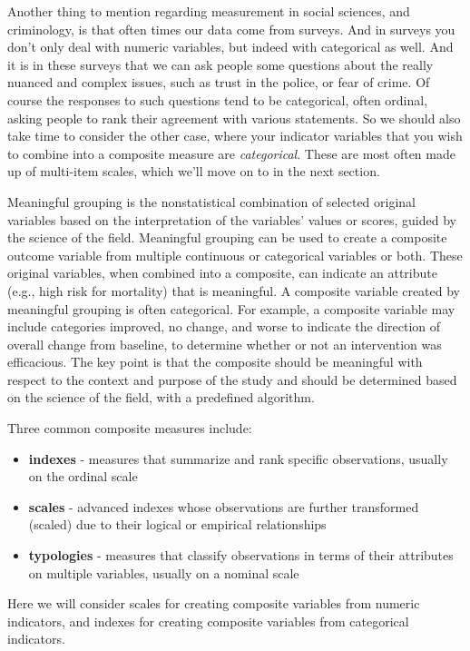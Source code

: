 \documentclass[]{book}
\providecommand{\tightlist}{%
  \setlength{\itemsep}{0pt}\setlength{\parskip}{0pt}}
\theoremstyle{definition}
\theoremstyle{definition}
\theoremstyle{definition}
\theoremstyle{remark}
\begin{document}
Another thing to mention regarding measurement in social sciences, and
criminology, is that often times our data come from surveys. And in
surveys you don't only deal with numeric variables, but indeed with
categorical as well. And it is in these surveys that we can ask people
some questions about the really nuanced and complex issues, such as
trust in the police, or fear of crime. Of course the responses to such
questions tend to be categorical, often ordinal, asking people to rank
their agreement with various statements. So we should also take time to
consider the other case, where your indicator variables that you wish to
combine into a composite measure are \emph{categorical}. These are most
often made up of multi-item scales, which we'll move on to in the next
section.

Meaningful grouping is the nonstatistical combination of selected
original variables based on the interpretation of the variables' values
or scores, guided by the science of the field. Meaningful grouping can
be used to create a composite outcome variable from multiple continuous
or categorical variables or both. These original variables, when
combined into a composite, can indicate an attribute (e.g., high risk
for mortality) that is meaningful. A composite variable created by
meaningful grouping is often categorical. For example, a composite
variable may include categories improved, no change, and worse to
indicate the direction of overall change from baseline, to determine
whether or not an intervention was efficacious. The key point is that
the composite should be meaningful with respect to the context and
purpose of the study and should be determined based on the science of
the field, with a predefined algorithm.

Three common composite measures include:

\begin{itemize}
\tightlist
\item
  \textbf{indexes} - measures that summarize and rank specific
  observations, usually on the ordinal scale
\item
  \textbf{scales} - advanced indexes whose observations are further
  transformed (scaled) due to their logical or empirical relationships
\item
  \textbf{typologies} - measures that classify observations in terms of
  their attributes on multiple variables, usually on a nominal scale
\end{itemize}

Here we will consider scales for creating composite variables from
numeric indicators, and indexes for creating composite variables from
categorical indicators.
\end{document}
